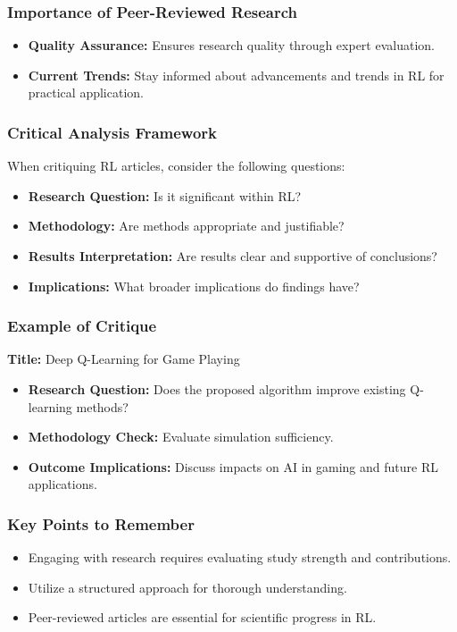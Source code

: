 \documentclass[aspectratio=169]{beamer}
\begin{document}
\begin{frame}[fragile]
    \frametitle{Importance of Peer-Reviewed Research}
    \begin{itemize}
        \item \textbf{Quality Assurance:} Ensures research quality through expert evaluation.
        \item \textbf{Current Trends:} Stay informed about advancements and trends in RL for practical application.
    \end{itemize}
\end{frame}

\begin{frame}[fragile]
    \frametitle{Critical Analysis Framework}
    When critiquing RL articles, consider the following questions:
    \begin{itemize}
        \item \textbf{Research Question:} Is it significant within RL?
        \item \textbf{Methodology:} Are methods appropriate and justifiable?
        \item \textbf{Results Interpretation:} Are results clear and supportive of conclusions?
        \item \textbf{Implications:} What broader implications do findings have?
    \end{itemize}
\end{frame}

\begin{frame}[fragile]
    \frametitle{Example of Critique}
    \textbf{Title:} Deep Q-Learning for Game Playing
    \begin{itemize}
        \item \textbf{Research Question:} Does the proposed algorithm improve existing Q-learning methods?
        \item \textbf{Methodology Check:} Evaluate simulation sufficiency.
        \item \textbf{Outcome Implications:} Discuss impacts on AI in gaming and future RL applications.
    \end{itemize}
\end{frame}

\begin{frame}[fragile]
    \frametitle{Key Points to Remember}
    \begin{itemize}
        \item Engaging with research requires evaluating study strength and contributions.
        \item Utilize a structured approach for thorough understanding.
        \item Peer-reviewed articles are essential for scientific progress in RL.
    \end{itemize}
\end{frame}
\end{document}

